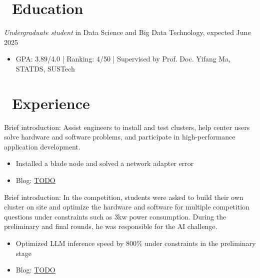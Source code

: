\documentclass{resume}
\begin{document}



\section{\faGraduationCap\ Education}
\textit{Undergraduate student} in Data Science and Big Data Technology, expected June 2025
\begin{itemize}
    \item GPA: 3.89/4.0 | Ranking: 4/50 | Supervised by Prof. Doc. Yifang Ma, STATDS, SUSTech
\end{itemize}

\section{\faUsers\ Experience}
Brief introduction: Assist engineers to install and test clusters, help center users solve hardware and software problems, and participate in high-performance application development.
\begin{itemize}
  \item Installed a blade node and solved a network adapter error
  \item Blog: \href{TODO}{TODO}
\end{itemize}

Brief introduction: In the competition, students were asked to build their own cluster on site and optimize the hardware and software for multiple competition questions under constraints such as 3kw power consumption. During the preliminary and final rounds, he was responsible for the AI challenge. 
\begin{itemize}
  \item Optimized LLM inference speed by 800\% under constraints in the preliminary stage
  \item Blog: \href{TODO}{TODO}
\end{itemize}
\end{document}
